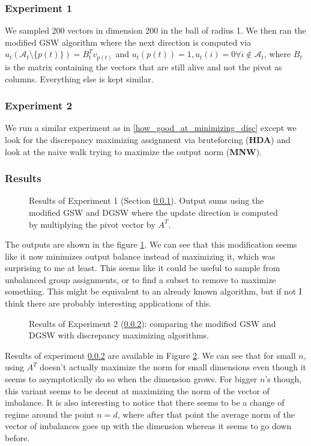 \documentclass[12pt]{article}
\begin{document}
\subsubsection{Experiment 1}\label{exp1_A_T}

We sampled 200 vectors in dimension 200 in the ball of radius 1. We then ran the modified GSW algorithm where the next direction is computed via $u_t(\mathcal{A}_t\setminus\{p(t)\})=B_t^Tv_{p(t)}$ and $u_t(p(t))=1, u_t(i)=0 \forall i\not\in\mathcal{A}_t$, where $B_t$ is the matrix containing the vectors that are still alive and not the pivot as columns. Everything else is kept similar. 

\subsubsection{Experiment 2}\label{exp2_A_T}


We run a similar experiment as in \ref{how_good_at_minimizing_disc} except we look for the discrepancy maximizing assignment via bruteforcing (\textbf{HDA}) and look at the naive walk trying to maximize the output norm (\textbf{MNW}).

\subsubsection{Results}
\begin{figure}[h]
\centering

\caption{Results of Experiment 1 (Section \ref{exp1_A_T}). Output sums using the modified GSW and DGSW where the update direction is computed by multiplying the pivot vector by $A^T$.}
\label{A_T_instead_of_lstsq}
\end{figure}
The outputs are shown in the figure \ref{A_T_instead_of_lstsq}. We can see that this modification seems like it now minimizes output balance instead of maximizing it, which was surprising to me at least. This seems like it could be useful to sample from unbalanced group assignments, or to find a subset to remove to maximize something. This might be equivalent to an already known algorithm, but if not I think there are probably interesting applications of this.

\begin{figure}[h]
\centering

\caption{Results of Experiment 2 (\ref{exp2_A_T}): comparing the modified GSW and DGSW with discrepancy maximizing algorithms.}
\label{A_T_instead_of_lstsq_2}
\end{figure}
Results of experiment \ref{exp2_A_T} are available in Figure \ref{A_T_instead_of_lstsq_2}. We can see that for small $n$, using $A^T$ doesn't actually maximize the norm for small dimensions even though it seems to asymptotically do so when the dimension grows. For bigger $n$'s though, this variant seems to be decent at maximizing the norm of the vector of imbalance. It is also interesting to notice that there seems to be a change of regime around the point $n=d$, where after that point the average norm of the vector of imbalances goes up with the dimension whereas it seems to go down before.
\end{document}
